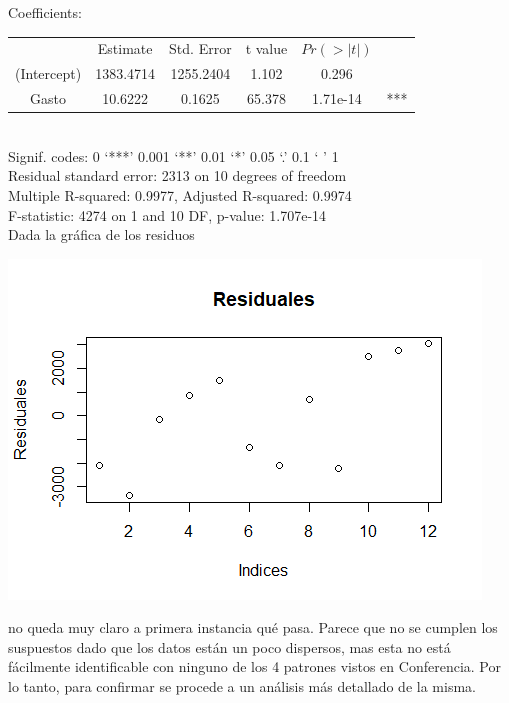 \documentclass[12pt,a4paper]{article}
\begin{document}
	Coefficients:\\

	\begin{tabular}{cccccc}
		 &     Estimate & Std. Error&     t value&   $Pr(>|t|)$&\\
		(Intercept) & 1383.4714 & 1255.2404 &  1.102  &  0.296&\\
		 Gasto      &   10.6222 &   0.1625  & 65.378  & 1.71e-14 &***\\
	\end{tabular}\\
	
	Signif. codes:  0 ‘***’ 0.001 ‘**’ 0.01 ‘*’ 0.05 ‘.’ 0.1 ‘ ’ 1\\
	
	Residual standard error: 2313 on 10 degrees of freedom\\
	
	Multiple R-squared:  0.9977,	Adjusted R-squared:  0.9974\\ 
	
	F-statistic:  4274 on 1 and 10 DF,  p-value: 1.707e-14\\
	
	Dada la gráfica de los residuos
	
	\begin{center}
		\includegraphics[scale=0.8]{images/PLOT1.png}
	\end{center}

	no queda muy claro a primera instancia qué pasa. Parece que no se cumplen los suspuestos dado que los datos están un poco dispersos, mas esta no está fácilmente identificable con ninguno de los 4 patrones vistos en Conferencia. Por lo tanto, para confirmar se procede a un análisis más detallado de la misma.
	
\end{document}
